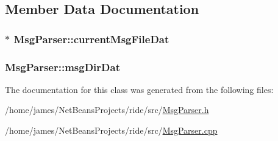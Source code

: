 \subsection{Member Data Documentation}
\hypertarget{class_msg_parser_ac6b6991b7abc90ee14dedf95bafa2db3}{
\subsubsection[{current\-Msg\-File\-Dat}]{$\ast$ Msg\-Parser\-::current\-Msg\-File\-Dat\hspace{0.3cm}{\ttfamily [private]}}}\label{class_msg_parser_ac6b6991b7abc90ee14dedf95bafa2db3}
\hypertarget{class_msg_parser_a5f738a06fca187d8e0c6ff2530fcd978}{
\subsubsection[{msg\-Dir\-Dat}]{ Msg\-Parser\-::msg\-Dir\-Dat\hspace{0.3cm}{\ttfamily [private]}}}\label{class_msg_parser_a5f738a06fca187d8e0c6ff2530fcd978}


The documentation for this class was generated from the following files\-:\begin{DoxyCompactItemize}
\item 
/home/james/\-Net\-Beans\-Projects/ride/src/\hyperlink{_msg_parser_8h}{Msg\-Parser.\-h}\item 
/home/james/\-Net\-Beans\-Projects/ride/src/\hyperlink{_msg_parser_8cpp}{Msg\-Parser.\-cpp}\end{DoxyCompactItemize}
